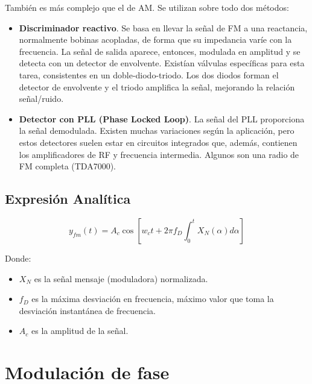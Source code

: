 \documentclass[a4paper]{article}
\begin{document}
También es más complejo que el de AM. Se utilizan sobre todo dos métodos:

\begin{itemize}
	\item \textbf{Discriminador reactivo}. Se basa en llevar la señal de FM a una reactancia, normalmente bobinas acopladas, de forma que su impedancia varíe con la frecuencia. La señal de salida aparece, entonces, modulada en amplitud y se detecta con un detector de envolvente. Existían válvulas específicas para esta tarea, consistentes en un doble-diodo-triodo. Los dos diodos forman el detector de envolvente y el triodo amplifica la señal, mejorando la relación señal/ruido.
	
	\item \textbf{Detector con PLL (Phase Locked Loop)}. La señal del PLL proporciona la señal demodulada. Existen muchas variaciones según la aplicación, pero estos detectores suelen estar en circuitos integrados que, además, contienen los amplificadores de RF y frecuencia intermedia. Algunos son una radio de FM completa (TDA7000).
\end{itemize}

\subsection{Expresi\'on Anal\'itica}

\[y_{fm}(t)=A_{c}\cos[w_ct + 2 \pi f_D \int_0^t X_{N}{(\alpha)} d\alpha]\]

Donde:

\begin{itemize}
	\item $X_{N}$ es la señal mensaje (moduladora) normalizada.

	\item $f_D$ es la máxima desviación en frecuencia, máximo valor que toma la desviación instantánea de frecuencia.

	\item $A_{c}$ es la amplitud de la señal.
\end{itemize}

\section{Modulación de fase}
\end{document}
